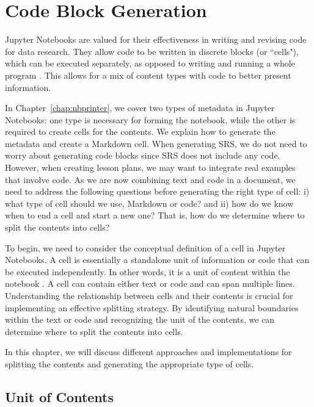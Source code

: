 \chapter{Code Block Generation} \label{chap:codeBlock}
Jupyter Notebooks are valued for their effectiveness in writing and revising 
code for data research. They allow code to be written in discrete blocks (or 
``cells"), which can be executed separately, as opposed to writing and running 
a whole program \cite{jupyterNotebookUsage}. This allows for a mix of content 
types with code to better present information. 

In Chapter~\ref{chap:nbprinter}, we cover two types of metadata in Jupyter 
Notebooks: one type is necessary for forming the notebook, while the other is 
required to create cells for the contents. We explain how to generate the 
metadata and create a Markdown cell. When generating SRS, we do not need to 
worry about generating code blocks since SRS does not include any code. 
However, when creating lesson plans, we may want to integrate real examples 
that involve code. As we are now combining text and code in a document, we need 
to address the following questions before generating the right type of cell: i) 
what type of cell should we use, Markdown or code? and ii) how do we know when 
to end a cell and start a new one? That is, how do we determine where to split 
the contents into cells?
 
To begin, we need to consider the conceptual definition of a cell in Jupyter 
Notebooks. A cell is essentially a standalone unit of information or code that 
can be executed independently. In other words, it is a unit of content within 
the notebook \cite{cellsseparation}. A cell can contain either text or code and 
can span multiple lines. Understanding the relationship between cells and their 
contents is crucial for implementing an effective splitting strategy. By 
identifying natural boundaries within the text or code and recognizing the unit 
of the contents, we can determine where to split the contents into cells.

In this chapter, we will discuss different approaches and implementations for 
splitting the contents and generating the appropriate type of cells.

\section{Unit of Contents}
